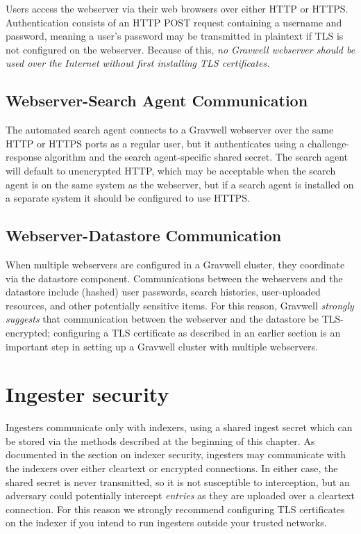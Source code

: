 Users access the webserver via their web browsers over either HTTP or
HTTPS. Authentication consists of an HTTP POST request containing a
username and password, meaning a user's password may be transmitted in
plaintext if TLS is not configured on the webserver. Because of this, \emph{no
Gravwell webserver should be used over the Internet without first
installing TLS certificates.}

\subsection{Webserver-Search Agent Communication}

The automated search agent connects to a Gravwell webserver over the
same HTTP or HTTPS ports as a regular user, but it authenticates using a
challenge-response algorithm and the search agent-specific shared
secret. The search agent will default to unencrypted HTTP, which may be
acceptable when the search agent is on the same system as the webserver,
but if a search agent is installed on a separate system it should be
configured to use HTTPS.

\subsection{Webserver-Datastore Communication}

When multiple webservers are configured in a Gravwell cluster, they
coordinate via the datastore component. Communications between the
webservers and the datastore include (hashed) user passwords, search
histories, user-uploaded resources, and other potentially sensitive
items. For this reason, Gravwell \emph{strongly suggests} that communication between
the webserver and the datastore be TLS-encrypted; configuring a TLS
certificate as described in an earlier section is an important step in
setting up a Gravwell cluster with multiple webservers.


\section{Ingester security}
Ingesters communicate only with indexers, using a shared ingest secret
which can be stored via the methods described at the beginning of this
chapter. As documented in the section on indexer security, ingesters may
communicate with the indexers over either cleartext or encrypted
connections. In either case, the shared secret is never transmitted, so
it is not susceptible to interception, but an adversary could
potentially intercept \emph{entries} as they are uploaded over a cleartext
connection. For this reason we strongly recommend configuring TLS
certificates on the indexer if you intend to run ingesters outside your
trusted networks.

